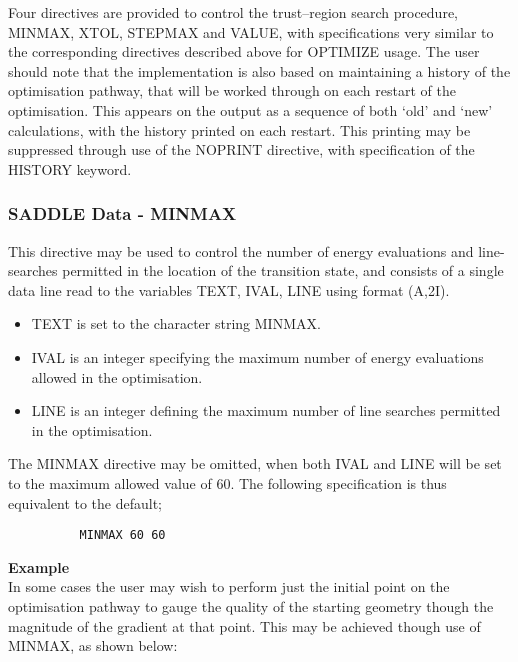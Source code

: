 \documentclass[11pt,fleqn]{article}
\begin{document}
Four directives are provided to control the trust--region
search procedure, MINMAX, XTOL, STEPMAX and VALUE, with specifications
very similar to the corresponding directives described above
for OPTIMIZE usage.
The user should note that the
implementation is also based on maintaining a history of the
optimisation pathway, that will be worked through on each restart of
the optimisation. This appears on the output as a sequence of both
`old' and `new' calculations, with the history printed on each
restart. This printing may be suppressed through use of the
NOPRINT directive, with specification of the HISTORY keyword.

\subsubsection[SADDLE Data - MINMAX]{SADDLE Data - MINMAX}

This directive may be used to
control the number of energy evaluations and line-searches permitted
in the location of the transition state, and consists of a single 
data line read to the variables TEXT, IVAL, LINE using format (A,2I).
\begin{itemize}
\item TEXT is set to the character string MINMAX.
\item IVAL is an integer specifying  the maximum number of 
energy evaluations allowed in the optimisation.
\item LINE is an integer defining the maximum number of line searches
permitted in the optimisation.
\end{itemize}
The MINMAX directive may be omitted, when both IVAL and LINE will
be set to the maximum allowed value of 60. 
The following specification is thus 
equivalent to the default;

{
\footnotesize
\begin{verbatim}
          MINMAX 60 60
\end{verbatim}
}
{\bf Example}\\

In some cases the user may wish to perform just the
initial point on the optimisation pathway to gauge the quality
of the starting geometry though the magnitude of the gradient at
that point. This may be achieved though use of MINMAX, as shown
below:\\
\end{document}
